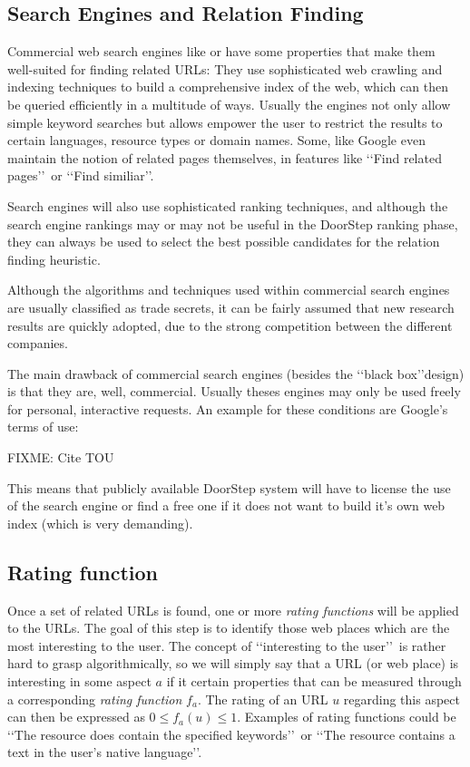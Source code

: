 \documentclass[a4paper]{danarticle}
\theoremstyle{remark}
\begin{document}
     \subsection{Search Engines and Relation Finding}
       Commercial web search engines like \cite{google} or \cite{altavista} have 
       some properties that make them well-suited for finding related URLs: They 
       use sophisticated web crawling and indexing techniques to build a 
       comprehensive index of the web, which can then be queried efficiently in 
       a multitude of ways. Usually the engines not only allow simple keyword 
       searches but allows empower the user to restrict the results to certain 
       languages, resource types or domain names. Some, like Google\cite{google} 
       even maintain the notion of related pages themselves, in features like 
       \lq\lq Find related pages\rq\rq\ or \lq\lq Find similiar\rq\rq . 
  
       Search engines will also use sophisticated ranking techniques, and 
       although the search engine rankings may or may not be useful in the 
       DoorStep ranking phase, they can always be used to select the best 
       possible candidates for the relation finding heuristic.
       
       Although the algorithms and techniques used within commercial search 
       engines are usually classified as trade secrets, it can be fairly assumed 
       that new research results are quickly adopted, due to the strong 
       competition between the different companies.
       
       The main drawback of commercial search engines (besides the \lq\lq black 
       box\rq\rq design) is that they are, well, commercial. Usually theses 
       engines may only be used freely for personal, interactive requests. An 
       example for these conditions are Google's terms of use\cite{googletou}:
       
       FIXME: Cite TOU
       
       This means that publicly available DoorStep system will have to license 
       the use of the search engine or find a free one if it does not want to 
       build it's own web index (which is very demanding).
     \subsection{Rating function}
       Once a set of related URLs is found, one or more 
       \textit{rating functions} will be applied to the URLs. The goal
       of this step is to identify those web places which are the
       most interesting to the user. The concept of \lq\lq interesting to the
       user\rq\rq\ is rather hard to grasp algorithmically, so we will simply 
       say that a URL (or web place) is
       interesting in some aspect $ a $ if it certain properties that can be
       measured through a corresponding \textit{rating function} 
       $ f_a $. The rating of an URL $ u $ regarding this aspect
       can then be expressed as $ 0 \leq f_a(u) \leq 1 $.
       Examples of rating
       functions could be \lq\lq The resource does contain the specified
       keywords\rq\rq\ or \lq\lq The resource contains a text in the user's
       native language\rq\rq .
       
\end{document}
